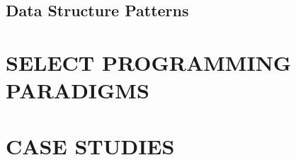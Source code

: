 \documentclass[oneside,11pt]{book} %
\theoremstyle{definition}
\theoremstyle{remark}
\begin{document}
    
    
    
    
    \chapter{Data Structure Patterns}\label{ch:datastructure}
    
    
    
    
    
    

    \part{\uppercase{Select Programming Paradigms}}\label{prt:advancedTopic}

    
    
    
    
    

    \part{\uppercase{Case Studies}}\label{prt:caseStudies}

    

    \appendix
    
    

    \backmatter
    
    \printindex


\end{document}
